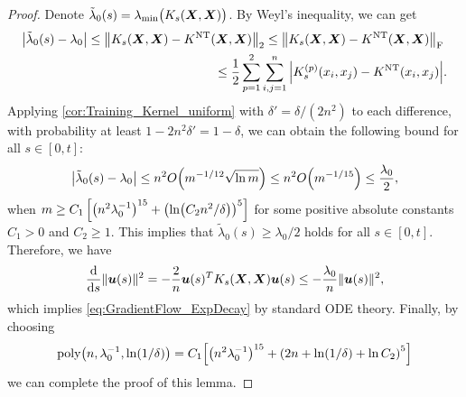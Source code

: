\begin{proof}
  Denote $\tilde{\lambda}_0(s)=\lambda_{\min}\big(K_s(\bm{X},\bm{X})\big)$.
  By Weyl's inequality, we can get
  \begin{align*}
    \abs{\tilde{\lambda}_0(s)-\lambda_0} \leq \norm{ K_s(\bm{X},\bm{X}) - K^{\mathrm{NT}}(\bm{X},\bm{X}) }_2\leq \norm{ K_s(\bm{X},\bm{X}) - K^{\mathrm{NT}}(\bm{X},\bm{X}) }_{\mathrm{F}}&\\
    \leq\frac12\sum_{p=1}^2\sum^n_{i,j=1} \abs{K^{(p)}_s(x_i,x_j) - K^{\mathrm{NT}}(x_i,x_j)}&.
  \end{align*}
  Applying \cref{cor:Training_Kernel_uniform} with $\delta'= {\delta}/{(2 n^2)}$ to each difference,
  with probability at least $1-2n^2\delta'=1-\delta$, we can obtain the following bound for all $s\in [0,t]$:
  \begin{align*}
    \abs{\tilde{\lambda}_0(s)-\lambda_0}\leq n^2 O\xkm{m^{-1/12} \sqrt{\ln m}}\leq n^2 O\xkm{m^{-1/15}}\leq\frac{\lambda_0}2,
  \end{align*}
  when $m\geq C_1\zk{\xk{n^{2}\lambda_0^{-1}}^{15}+\xk{\ln\xkm{C_2n^2/\delta}}^5}$ for some positive absolute constants $C_1>0$ and $C_2\geq 1$.
  This implies that $\tilde{\lambda}_0(s)\geq\lambda_0/2$ holds for all $s\in [0,t]$.
  Therefore, we have
  \begin{equation*}
    \frac{\dd}{\dd s}\|\bm{u}(s)\|^{2}=- \frac{2}{n}\bm{u}(s)^T K_{s}(\bm{X},\bm{X}) \bm{u}(s)\le -\frac{\lambda_{0}}{n} \lVert \bm{u}(s)\rVert^{2},
  \end{equation*}
  which implies \cref{eq:GradientFlow_ExpDecay} by standard ODE theory.
  Finally, by choosing
  \begin{align*}
    \poly\xkm{n,\lambda_0^{-1},\ln(1/\delta)}=C_1\zkm{\xk{n^{2}\lambda_0^{-1}}^{15}+\xk{2n+\ln(1/\delta)+\ln C_2}^5}
  \end{align*}
  we can complete the proof of this lemma.
\end{proof}





